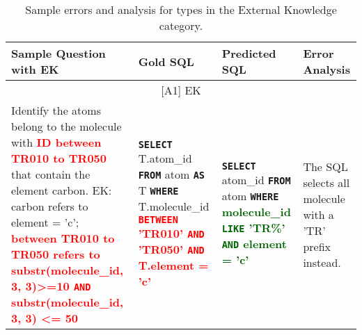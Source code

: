 \newcommand{\bt}[1]{\textbf{\texttt{#1}}}
\newcommand{\gh}[1]{\textbf{\textcolor{darkgreen}{#1}}}
\newcommand{\rh}[1]{\textbf{\textcolor{red}{#1}}}


\begin{table*}[t]
\centering
\begin{adjustbox}{max width=\textwidth}
\begin{tabular}{p{4.75cm} p{5.5cm} p{5.5cm} p{2.5cm}}
\toprule
\textbf{Sample Question with EK} & \textbf{Gold SQL} & \textbf{Predicted SQL} & \textbf{Error Analysis}\\
\midrule
\multicolumn{4}{c}{[A1] EK} \\
\midrule
 Identify the atoms belong to the molecule with \rh{ID between TR010 to TR050} that contain the element carbon. EK: carbon refers to element = 'c'; \rh{between TR010 to TR050 refers to substr(molecule\_id, 3, 3)>=10 \bt{AND} substr(molecule\_id, 3, 3) <= 50}
 & \raggedright \bt{SELECT} T.atom\_id \bt{FROM} atom \bt{AS} T \bt{WHERE} T.molecule\_id \rh{\bt{BETWEEN} 'TR010' \bt{AND} 'TR050' \bt{AND} T.element = 'c'}
 & \raggedright \bt{SELECT} atom\_id \bt{FROM} atom \bt{WHERE} \gh{molecule\_id \bt{LIKE} 'TR\%' \bt{AND} element = 'c'}
 & The SQL selects all molecule with a 'TR' prefix instead. \\
\bottomrule
\end{tabular}
\end{adjustbox}
\caption{Sample errors and analysis for types in the External Knowledge category.}
\label{table:ErrorSampleEK}
\end{table*}


